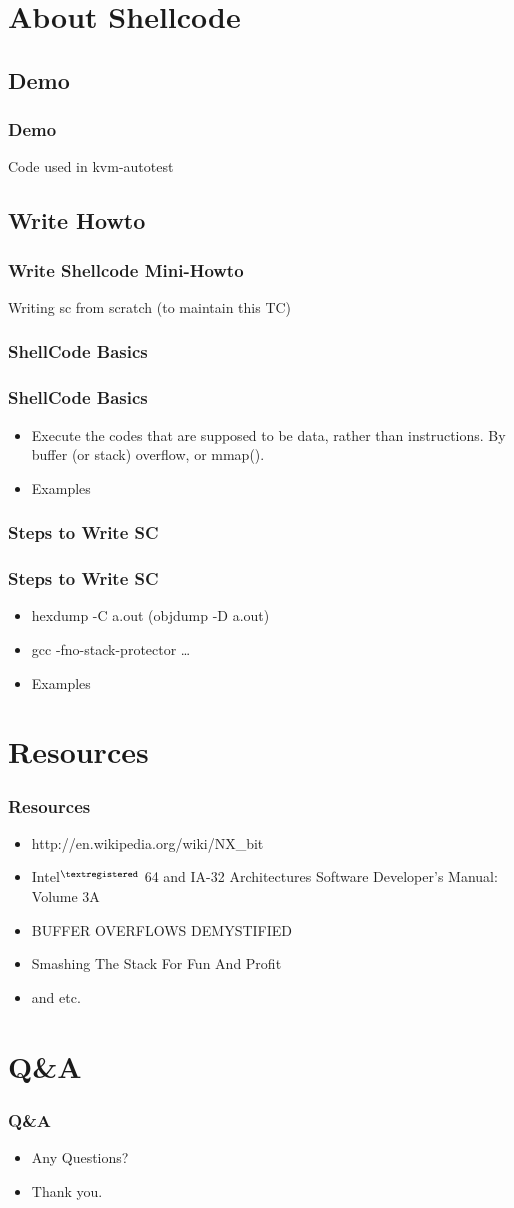\documentclass{beamer}
\begin{document}
\section{About Shellcode}
\subsection{Demo}
\frame
{
  \frametitle{Demo}
  Code used in kvm-autotest
}

\subsection{Write Howto}
\frame
{
  \frametitle{Write Shellcode Mini-Howto}
  Writing sc from scratch (to maintain this TC)

}

\subsubsection{ShellCode Basics}
\frame
{
  \frametitle{ShellCode Basics}
  \begin{itemize}
  \item Execute the codes that are supposed to be data,
  rather than instructions. By buffer (or stack) overflow, or mmap().

  \pause
  \item Examples
  \end{itemize}
}

\subsubsection{Steps to Write SC}
\frame
{
  \frametitle{Steps to Write SC}
  \begin{itemize}
  \item hexdump -C a.out (objdump -D a.out)
  \pause
  \item gcc -fno-stack-protector \dots
  \pause
  \item Examples
  \end{itemize}
}


\section{Resources}
\frame
{
  \frametitle{Resources}
  \begin{itemize}
  \item
  http://en.wikipedia.org/wiki/NX\_bit
  \item
  Intel$^{\tiny{\textregistered}}$ 64 and IA-32 Architectures Software Developer’s Manual: Volume 3A
  \item
  BUFFER OVERFLOWS DEMYSTIFIED
  \item
  Smashing The Stack For Fun And Profit
  \item
  and etc.
  \end{itemize}
}

\section{Q\&A}
\frame
{
  \frametitle{Q\&A}

  \begin{itemize}
  \item Any Questions?
  \pause
  \item Thank you.
  \end{itemize}
}
\end{document}
